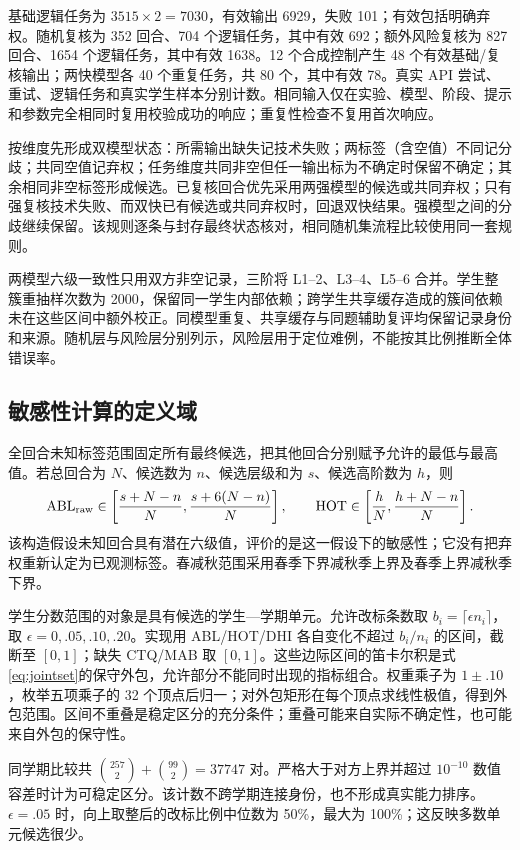 基础逻辑任务为 $3515\times2=7030$，有效输出 6929，失败 101；有效包括明确弃权。随机复核为 352 回合、704 个逻辑任务，其中有效 692；额外风险复核为 827 回合、1654 个逻辑任务，其中有效 1638。12 个合成控制产生 48 个有效基础/复核输出；两快模型各 40 个重复任务，共 80 个，其中有效 78。真实 API 尝试、重试、逻辑任务和真实学生样本分别计数。相同输入仅在实验、模型、阶段、提示和参数完全相同时复用校验成功的响应；重复性检查不复用首次响应。

按维度先形成双模型状态：所需输出缺失记技术失败；两标签（含空值）不同记分歧；共同空值记弃权；任务维度共同非空但任一输出标为不确定时保留不确定；其余相同非空标签形成候选。已复核回合优先采用两强模型的候选或共同弃权；只有强复核技术失败、而双快已有候选或共同弃权时，回退双快结果。强模型之间的分歧继续保留。该规则逐条与封存最终状态核对，相同随机集流程比较使用同一套规则。

两模型六级一致性只用双方非空记录，三阶将 L1--2、L3--4、L5--6 合并。学生整簇重抽样次数为 2000，保留同一学生内部依赖；跨学生共享缓存造成的簇间依赖未在这些区间中额外校正。同模型重复、共享缓存与同题辅助复评均保留记录身份和来源。随机层与风险层分别列示，风险层用于定位难例，不能按其比例推断全体错误率。

\subsection{敏感性计算的定义域}
全回合未知标签范围固定所有最终候选，把其他回合分别赋予允许的最低与最高值。若总回合为 $N$、候选数为 $n$、候选层级和为 $s$、候选高阶数为 $h$，则
\begin{equation}
\mathrm{ABL}_{\rm raw}\in\left[\frac{s+N-n}{N},\frac{s+6(N-n)}{N}\right],\qquad
\mathrm{HOT}\in\left[\frac hN,\frac{h+N-n}{N}\right].
\end{equation}
该构造假设未知回合具有潜在六级值，评价的是这一假设下的敏感性；它没有把弃权重新认定为已观测标签。春减秋范围采用春季下界减秋季上界及春季上界减秋季下界。

学生分数范围的对象是具有候选的学生—学期单元。允许改标条数取 $b_i=\lceil\epsilon n_i\rceil$，取 $\epsilon=0,.05,.10,.20$。实现用 ABL/HOT/DHI 各自变化不超过 $b_i/n_i$ 的区间，截断至 $[0,1]$；缺失 CTQ/MAB 取 $[0,1]$。这些边际区间的笛卡尔积是式\eqref{eq:jointset}的保守外包，允许部分不能同时出现的指标组合。权重乘子为 $1\pm .10$，枚举五项乘子的 32 个顶点后归一；对外包矩形在每个顶点求线性极值，得到外包范围。区间不重叠是稳定区分的充分条件；重叠可能来自实际不确定性，也可能来自外包的保守性。

同学期比较共 $\binom{257}{2}+\binom{99}{2}=37747$ 对。严格大于对方上界并超过 $10^{-10}$ 数值容差时计为可稳定区分。该计数不跨学期连接身份，也不形成真实能力排序。$\epsilon=.05$ 时，向上取整后的改标比例中位数为 50\%，最大为 100\%；这反映多数单元候选很少。

